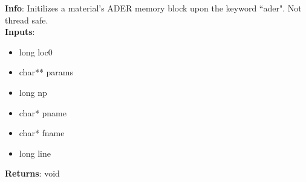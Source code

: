 \textbf{Info}: Initilizes a material's ADER memory block upon the keyword
``ader". Not thread safe. \\

\noindent \textbf{Inputs}:
    \begin{itemize}
        \item{long loc0}
        \item{char** params}
        \item{long np}
        \item{char* pname}
        \item{char* fname}
        \item{long line}
    \end{itemize}

\noindent \textbf{Returns}: void
